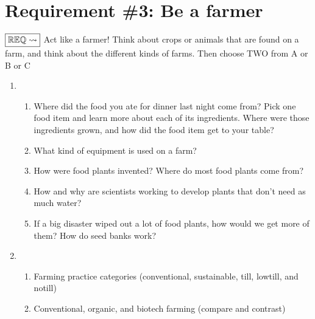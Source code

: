 \documentclass[letterpaper,10pt,english,openany,oneside]{sphinxmanual}
\begin{document}
\chapter{Requirement \#3: Be a farmer}
\label{\detokenize{requirement3:requirement-3-be-a-farmer}}\label{\detokenize{requirement3::doc}}
\(\boxed{\mathbb{REQ}\Large \rightsquigarrow}\) Act like a farmer! Think about crops or animals that are found on a farm, and think about the different kinds of farms. Then choose TWO from A or B or C
\begin{enumerate}
%
\item {} 
\begin{enumerate}
%
\item {} 
Where did the food you ate for dinner last night come from? Pick one food item and learn more about each of its ingredients. Where were those ingredients grown, and how did the food item get to your table?

\item {} 
What kind of equipment is used on a farm?

\item {} 
How were food plants invented? Where do most food plants come from?

\item {} 
How and why are scientists working to develop plants that don’t need as much water?

\item {} 
If a big disaster wiped out a lot of food plants, how would we get more of them? How do seed banks work?

\end{enumerate}

\item {} 
\begin{enumerate}
%
\item {} 
Farming practice categories (conventional, sustainable, till, low\sphinxhyphen{}till, and no\sphinxhyphen{}till)

\item {} 
Conventional, organic, and biotech farming (compare and contrast)


\end{enumerate}
\end{enumerate}
\end{document}
